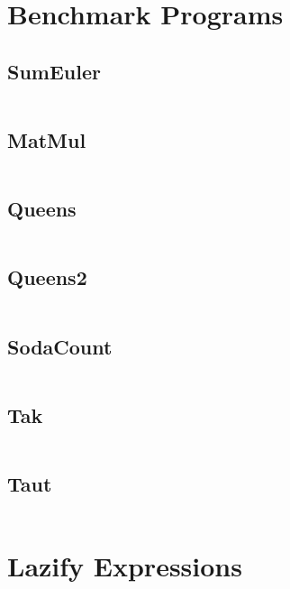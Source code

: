 \documentclass[openright, dottedtoc, headinclude, footinclude=true, a4paper, numbers=noenddot]{scrreprt}
\begin{document}
\begin{appendices}

\chapter{Benchmark Programs}
\label{append:bench}

    \section{SumEuler}
    \inputminted{haskell}{benchmarks/SumEuler.hs}
    \clearpage

    \section{MatMul}
    \inputminted{haskell}{benchmarks/MatMul.hs}
    \clearpage

    \section{Queens}
    \inputminted{haskell}{benchmarks/Queens.hs}
    \clearpage

    \section{Queens2}
    \inputminted{haskell}{benchmarks/Queens2.hs}
    \clearpage

    \section{SodaCount}
    \inputminted{haskell}{benchmarks/SodaCount.hs}
    \clearpage

    \section{Tak}
    \inputminted{haskell}{benchmarks/tak.hs}
    \clearpage

    \section{Taut}
    \inputminted{haskell}{benchmarks/Taut.hs}
    \clearpage

\chapter{Lazify Expressions}
\label{chap:lazify}


\end{appendices}

\listoftodos[Notes]

\if@openright
  \cleardoublepage
\else
  \clearpage
\fi



\end{document}
